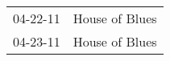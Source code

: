 \begin{supertabular}{p{0.07\textwidth}p{0.23\textwidth}}
 04-22-11 &  House of Blues \\
 04-23-11 &  House of Blues \\
\end{supertabular}
